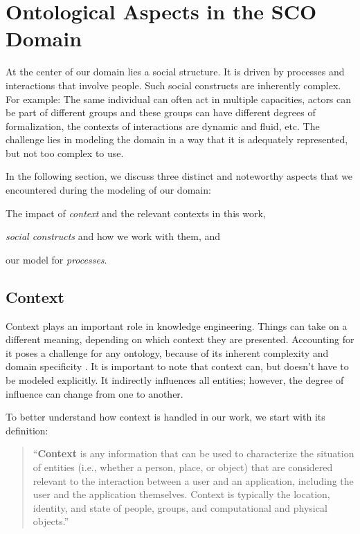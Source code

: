 \documentclass[a4paper, DIV=13, BCOR=0cm]{scrbook}
\begin{document}
\chapter{Ontological Aspects in the SCO Domain }
\label{domain-aspects}
At the center of our domain lies a social structure. It is driven by processes and interactions that involve people. Such social constructs are inherently complex. For example: The same individual can often act in multiple capacities, actors can be part of different groups and these groups can have different degrees of formalization, the contexts of interactions are dynamic and fluid, etc. The challenge lies in modeling the domain in a way that it is adequately represented, but not too complex to use.

In the following section, we discuss three distinct and noteworthy aspects that we encountered during the modeling of our domain:
\begin{inparablank}
	\item The impact of \textit{context} and the relevant contexts in this work,
	\item \textit{social constructs} and how we work with them, and
	\item our model for \textit{processes}.
\end{inparablank}

\section{Context }
\label{context}
Context plays an important role in knowledge engineering. Things can take on a different meaning, depending on which context they are presented. Accounting for it poses a challenge for any ontology, because of its inherent complexity and domain specificity \cite[p.\,1]{moore2012intelligent}. It is important to note that context can, but doesn't have to be modeled explicitly. It indirectly influences all entities; however, the degree of influence can change from one to another.

To better understand how context is handled in our work, we start with its definition:
\begin{quote}
	\enquote{\textbf{Context} is any information that can be used to characterize the situation of entities (i.e., whether a person, place, or object) that are considered relevant to the interaction between a user and an application, including the user and the application themselves. Context is typically the location, identity, and state of people, groups, and computational and physical objects.} \cite[p.\,106]{dey2001conceptual}
\end{quote}
\end{document}
